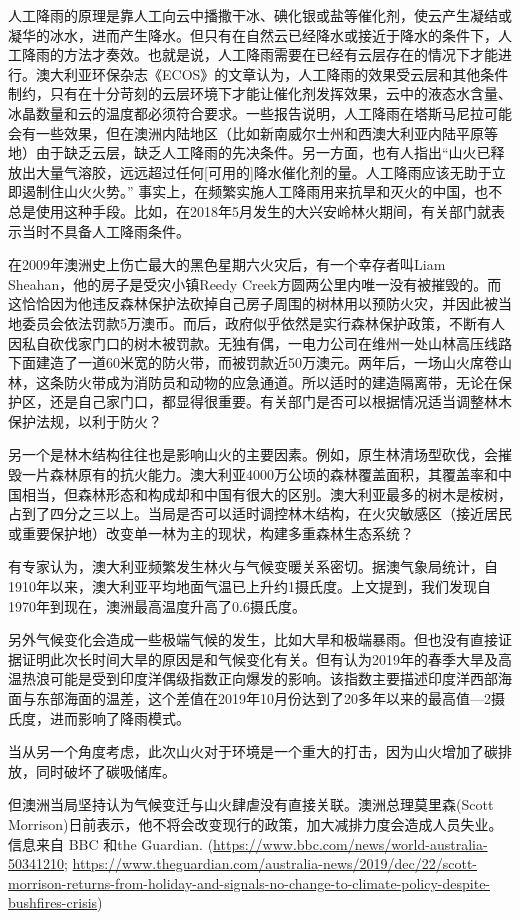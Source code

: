 \documentclass[]{book}
\begin{document}
人工降雨的原理是靠人工向云中播撒干冰、碘化银或盐等催化剂，使云产生凝结或凝华的冰水，进而产生降水。但只有在自然云已经降水或接近于降水的条件下，人工降雨的方法才奏效。也就是说，人工降雨需要在已经有云层存在的情况下才能进行。澳大利亚环保杂志《ECOS》的文章认为，人工降雨的效果受云层和其他条件制约，只有在十分苛刻的云层环境下才能让催化剂发挥效果，云中的液态水含量、冰晶数量和云的温度都必须符合要求。一些报告说明，人工降雨在塔斯马尼拉可能会有一些效果，但在澳洲内陆地区（比如新南威尔士州和西澳大利亚内陆平原等地）由于缺乏云层，缺乏人工降雨的先决条件。另一方面，也有人指出``山火已释放出大量气溶胶，远远超过任何{[}可用的{]}降水催化剂的量。人工降雨应该无助于立即遏制住山火火势。'' 事实上，在频繁实施人工降雨用来抗旱和灭火的中国，也不总是使用这种手段。比如，在2018年5月发生的大兴安岭林火期间，有关部门就表示当时不具备人工降雨条件。

在2009年澳洲史上伤亡最大的黑色星期六火灾后，有一个幸存者叫Liam Sheahan，他的房子是受灾小镇Reedy Creek方圆两公里内唯一没有被摧毁的。而这恰恰因为他违反森林保护法砍掉自己房子周围的树林用以预防火灾，并因此被当地委员会依法罚款5万澳币。而后，政府似乎依然是实行森林保护政策，不断有人因私自砍伐家门口的树木被罚款。无独有偶，一电力公司在维州一处山林高压线路下面建造了一道60米宽的防火带，而被罚款近50万澳元。两年后，一场山火席卷山林，这条防火带成为消防员和动物的应急通道。所以适时的建造隔离带，无论在保护区，还是自己家门口，都显得很重要。有关部门是否可以根据情况适当调整林木保护法规，以利于防火？

另一个是林木结构往往也是影响山火的主要因素。例如，原生林清场型砍伐，会摧毁一片森林原有的抗火能力。澳大利亚4000万公顷的森林覆盖面积，其覆盖率和中国相当，但森林形态和构成却和中国有很大的区别。澳大利亚最多的树木是桉树，占到了四分之三以上。当局是否可以适时调控林木结构，在火灾敏感区（接近居民或重要保护地）改变单一林为主的现状，构建多重森林生态系统？

有专家认为，澳大利亚频繁发生林火与气候变暖关系密切。据澳气象局统计，自1910年以来，澳大利亚平均地面气温已上升约1摄氏度。上文提到，我们发现自1970年到现在，澳洲最高温度升高了0.6摄氏度。

另外气候变化会造成一些极端气候的发生，比如大旱和极端暴雨。但也没有直接证据证明此次长时间大旱的原因是和气候变化有关。但有认为2019年的春季大旱及高温热浪可能是受到印度洋偶级指数正向爆发的影响。该指数主要描述印度洋西部海面与东部海面的温差，这个差值在2019年10月份达到了20多年以来的最高值---2摄氏度，进而影响了降雨模式。

当从另一个角度考虑，此次山火对于环境是一个重大的打击，因为山火增加了碳排放，同时破坏了碳吸储库。

但澳洲当局坚持认为气候变迁与山火肆虐没有直接关联。澳洲总理莫里森(Scott Morrison)日前表示，他不将会改变现行的政策，加大减排力度会造成人员失业。信息来自 BBC 和the Guardian. (\url{https://www.bbc.com/news/world-australia-50341210}; \url{https://www.theguardian.com/australia-news/2019/dec/22/scott-morrison-returns-from-holiday-and-signals-no-change-to-climate-policy-despite-bushfires-crisis})
\end{document}
